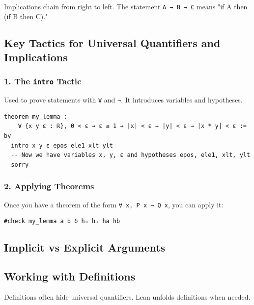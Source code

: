 \documentclass{amsart}
\theoremstyle{plain}
\theoremstyle{definition}
\theoremstyle{remark}
\begin{document}
Implications chain from right to left. The statement \lstinline{A → B → C} means "if A then (if B then C)."

\subsection{Key Tactics for Universal Quantifiers and Implications}

\subsubsection{1. The \lstinline{intro} Tactic}

Used to prove statements with \lstinline{∀} and \lstinline{→}. It introduces variables and hypotheses.

\begin{lstlisting}[language=lean]
theorem my_lemma :
    ∀ {x y ε : ℝ}, 0 < ε → ε ≤ 1 → |x| < ε → |y| < ε → |x * y| < ε := by
  intro x y ε epos ele1 xlt ylt
  -- Now we have variables x, y, ε and hypotheses epos, ele1, xlt, ylt
  sorry
\end{lstlisting}
\subsubsection{2. Applying Theorems}

Once you have a theorem of the form \lstinline{∀ x, P x → Q x}, you can apply it:

\begin{lstlisting}[language=lean]
#check my_lemma a b δ h₀ h₁ ha hb
\end{lstlisting}
\subsection{Implicit vs Explicit Arguments}


\subsection{Working with Definitions}

Definitions often hide universal quantifiers. Lean unfolds definitions when needed.
\end{document}
